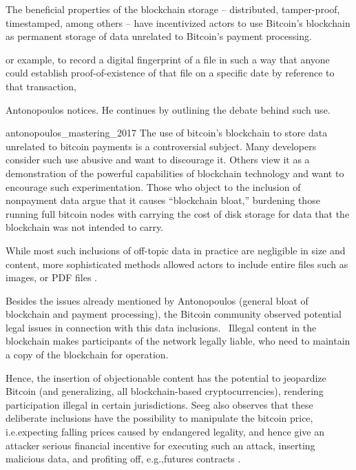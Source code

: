\documentclass[a4paper,11pt,titlepage]{scrbook}
\begin{document}
The beneficial properties of the blockchain storage – distributed, tamper-proof, timestamped, among others – have incentivized actors to use Bitcoin's blockchain as permanent storage of data unrelated to Bitcoin's payment processing.
\begin{displayquote}
    or example, to record a digital fingerprint
    of a file in such a way that anyone could establish proof-of-existence of that file on a specific date by reference to that transaction,
\end{displayquote}
Antonopoulos notices. He continues by outlining the debate behind such use.
\begin{displaycquote}[155]{antonopoulos_mastering_2017}
    The use of bitcoin’s blockchain to store data unrelated to bitcoin payments is a controversial subject.
    Many developers consider such use abusive and want to discourage it.
    Others view it as a demonstration of the powerful capabilities of blockchain technology and want to encourage such experimentation. Those who object to the inclusion of nonpayment data argue that it causes \enquote{blockchain bloat,} burdening those running full bitcoin nodes with carrying the cost of disk storage for data that the blockchain was not intended to carry.
\end{displaycquote}
While most such inclusions of off-topic data in practice are negligible in size and content, more sophisticated methods allowed actors to include entire files such as images, or PDF files \cite{matzutt_quantitative_2018}.

Besides the issues already mentioned by Antonopoulos (general bloat of blockchain and payment processing), the Bitcoin community observed potential legal issues in connection with this data inclusions.~\cite{bitcoinwiki_weaknesses_2011}\@
Illegal content in the blockchain makes participants of the network legally liable, who need to maintain a copy of the blockchain for operation.

Hence, the insertion of objectionable content has the potential to jeopardize Bitcoin (and generalizing, all blockchain-based cryptocurrencies), rendering participation illegal in certain jurisdictions.
Seeg also observes that these deliberate inclusions have the possibility to manipulate the bitcoin price, i.e.\@ expecting falling prices caused by endangered legality, and hence give an attacker serious financial incentive for executing such an attack, inserting malicious data, and profiting off, e.g.,\@ futures contracts \cite[1--2]{seeg_hardening_2018}.
\end{document}
